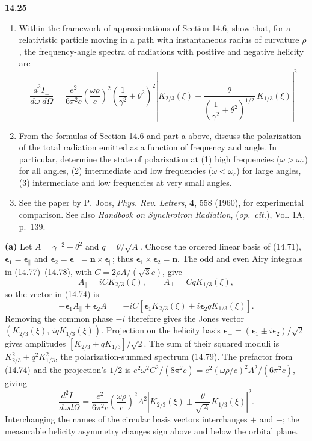 \par\bigskip
\noindent\textbf{14.25}\quad\begin{enumerate}
\item[(a)] Within the framework of approximations of Section 14.6, show that, for a relativistic particle moving in a path with instantaneous radius of curvature $\rho$, the frequency-angle spectra of radiations with positive and negative helicity are
\[
\frac{d^{2}I_{\pm}}{d\omega\;d\Omega}=\frac{e^{2}}{6\pi^{2}c}\left(\frac{\omega\rho}{c}\right)^{2}\!\left(\frac{1}{\gamma^{2}}+\theta^{2}\right)^{2}\left|K_{2/3}(\xi)\pm\frac{\theta}{\left(\dfrac{1}{\gamma^{2}}+\theta^{2}\right)^{1/2}}\,K_{1/3}(\xi)\right|^{2}
\]
\item[(b)] From the formulas of Section 14.6 and part a above, discuss the polarization of the total radiation emitted as a function of frequency and angle. In particular, determine the state of polarization at (1) high frequencies ($\omega>\omega_{c}$) for all angles, (2) intermediate and low frequencies ($\omega<\omega_{c}$) for large angles, (3) intermediate and low frequencies at very small angles.
\item[(c)] See the paper by P.~Joos, \emph{Phys. Rev. Letters}, \textbf{4}, 558 (1960), for experimental comparison. See also \emph{Handbook on Synchrotron Radiation}, (\emph{op.\ cit.}), Vol. 1A, p.~139.
\end{enumerate}
\solution

\textbf{(a)} Let $A=\gamma^{-2}+\theta^2$ and
$q=\theta/\sqrt A$. Choose the ordered linear basis of (14.71),
$\boldsymbol\epsilon_1=\boldsymbol\epsilon_\parallel$ and
$\boldsymbol\epsilon_2=\boldsymbol\epsilon_\perp
=\mathbf n\times\boldsymbol\epsilon_\parallel$; thus
$\boldsymbol\epsilon_1\times\boldsymbol\epsilon_2=\mathbf n$.
The odd and even Airy integrals in (14.77)--(14.78), with
$C=2\rho A/(\sqrt3c)$, give
\[
A_\parallel=iC K_{2/3}(\xi),\qquad
A_\perp=CqK_{1/3}(\xi),
\]
so the vector in (14.74) is
\[
-\boldsymbol\epsilon_1A_\parallel+\boldsymbol\epsilon_2A_\perp
=-iC[\boldsymbol\epsilon_1K_{2/3}(\xi)
+i\boldsymbol\epsilon_2qK_{1/3}(\xi)].
\]
Removing the common phase $-i$ therefore gives the Jones vector
$(K_{2/3}(\xi),\,iqK_{1/3}(\xi))$.
Projection on the helicity basis
$\boldsymbol\epsilon_\pm=(\boldsymbol\epsilon_1\pm
 i\boldsymbol\epsilon_2)/\sqrt2$ gives amplitudes
$[K_{2/3}\pm qK_{1/3}]/\sqrt2$.
The sum of their squared moduli is
$K_{2/3}^2+q^2K_{1/3}^2$, the polarization-summed spectrum (14.79).
The prefactor from (14.74) and the projection's $1/2$ is
$e^2\omega^2 C^2/(8\pi^2c)
=e^2(\omega\rho/c)^2A^2/(6\pi^2c)$, giving
\[
\boxed{\frac{d^2I_\pm}{d\omega d\Omega}
=\frac{e^2}{6\pi^2c}\left(\frac{\omega\rho}c\right)^2A^2
\left|K_{2/3}(\xi)\pm\frac\theta{\sqrt A}K_{1/3}(\xi)\right|^2.}
\]
Interchanging the names of the circular basis vectors interchanges
$+$ and $-$; the measurable helicity asymmetry changes sign above
and below the orbital plane.

